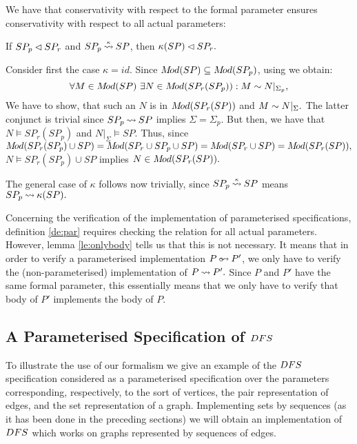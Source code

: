 We have that conservativity with respect to the formal parameter ensures conservativity with respect to all actual parameters: \begin{LEMMA}\label{le:conservative}
If $SP_p\lhd SP_r$ and $SP_p\mathbin{\stackrel{\scriptscriptstyle \kappa}{\mathbin{\leadsto}}} SP$, then $\kappa(SP)\lhd SP_r.$
\end{LEMMA}
\begin{PROOF}
Consider first the case $\kappa=id.$
Since $M\!od(SP)\subseteq M\!od(SP_p)$, using  we obtain:
\[\forall M\in \Mod(SP)\ \exists N\in \Mod(SP_r(SP_p)): M\eleq N|_{\Sigma_{p}},\]
We have to show, that such an $N$ is in $M\!od(SP_r(SP))$ and $M\sim N|_\Sigma.$
The latter conjunct is trivial since $SP_p\mathbin{\leadsto} SP$ implies $\Sigma=\Sigma_p.$ But then, we have that $N\models SP_r(SP_p)$ and $N|_\Sigma\models SP$. Thus, since $M\!od(SP_r(SP_p)\cup SP)=M\!od(SP_r\cup SP_p\cup SP)=M\!od(SP_r\cup SP)= M\!od(SP_r(SP)),$
$N\models SP_r(SP_p)\cup SP$ implies $N\in M\!od(SP_r(SP)).$ 

The general case of $\kappa$ follows now trivially, since $SP_p\mathbin{\stackrel{\scriptscriptstyle \kappa}{\mathbin{\leadsto}}} SP$ means $SP_p\mathbin{\leadsto} \kappa(SP).$
\end{PROOF}
Concerning the verification of the implementation of parameterised specifications,
definition \ref{de:par} requires checking the relation for all actual parameters. However, lemma \ref{le:onlybody} tells us that this is not 
necessary.
It means that in order to verify a parameterised implementation $P\pim P'$, we
only have to verify the (non-parameterised) implementation of $P\mathbin{\leadsto} P'.$ Since $P$ and $P'$ have the same formal parameter, this essentially means that we only have to verify that body of $P'$ implements the body of $P$.

\subsection{A Parameterised Specification of $DFS$} To illustrate the use of our formalism we give an example of the $DFS$ specification considered as a parameterised specification over the parameters corresponding, respectively, to the sort of vertices, the pair representation of edges, and the set representation of a graph. Implementing sets by sequences (as it has been done in the preceding sections) we will obtain an implementation of $DFS$ which works on graphs represented by sequences of edges.

